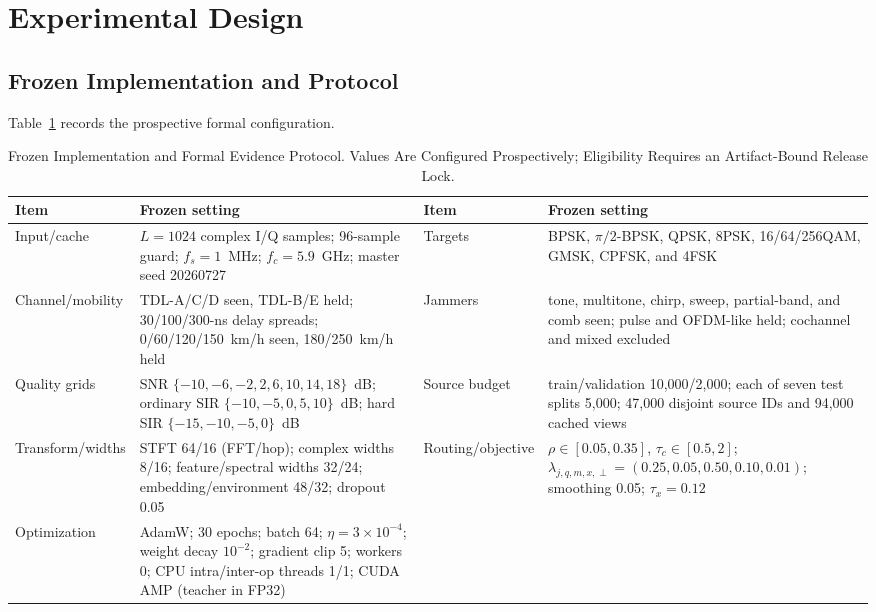 \documentclass[letterpaper,journal]{IEEEtran}
\newif\ifinternalreview
\begin{document}
\section{Experimental Design}
\subsection{Frozen Implementation and Protocol}
Table~\ref{tab:frozenprotocol} records the prospective formal configuration.
\ifinternalreview
The formal headline cache and run have not been generated in this
internal-review build; only screening/integration cache evidence exists, and
none of its metrics enters a result table.
\fi

\begin{table}[t]
\centering
\caption{Frozen Implementation and Formal Evidence Protocol. Values Are
Configured Prospectively; Eligibility Requires an Artifact-Bound Release Lock.}
\label{tab:frozenprotocol}
\scriptsize
\setlength{\tabcolsep}{2pt}
\renewcommand{\arraystretch}{1.06}
\begin{tabular}{@{}p{}p{}p{}p{}@{}}
\toprule
Item & Frozen setting & Item & Frozen setting\\
\midrule
Input/cache & $L=1024$ complex I/Q samples; 96-sample guard; $f_s=1$~MHz;
$f_c=5.9$~GHz; master seed 20260727 &
Targets & BPSK, $\pi/2$-BPSK, QPSK, 8PSK, 16/64/256QAM, GMSK, CPFSK, and
4FSK\\
Channel/mobility & TDL-A/C/D seen, TDL-B/E held; 30/100/300-ns delay
spreads; 0/60/120/150~km/h seen, 180/250~km/h held &
Jammers & tone, multitone, chirp, sweep, partial-band, and comb seen; pulse
and OFDM-like held; cochannel and mixed excluded\\
Quality grids & SNR $\{-10,-6,-2,2,6,10,14,18\}$~dB; ordinary SIR
$\{-10,-5,0,5,10\}$~dB; hard SIR $\{-15,-10,-5,0\}$~dB &
Source budget & train/validation 10,000/2,000; each of seven test splits
5,000; 47,000 disjoint source IDs and 94,000 cached views\\
Transform/widths & STFT 64/16 (FFT/hop); complex widths 8/16;
feature/spectral widths 32/24; embedding/environment 48/32; dropout 0.05 &
Routing/objective & $\rho\in[0.05,0.35]$, $\tau_c\in[0.5,2]$;
$\lambda_{j,q,m,x,\perp}=(0.25,0.05,0.50,0.10,0.01)$; smoothing 0.05;
$\tau_x=0.12$\\
Optimization & AdamW; 30 epochs; batch 64; $\eta=3\!\times\!10^{-4}$;
weight decay $10^{-2}$; gradient clip 5; workers 0; CPU intra/inter-op
threads 1/1; CUDA AMP (teacher in FP32) &

\end{tabular}
\end{table}
\end{document}
